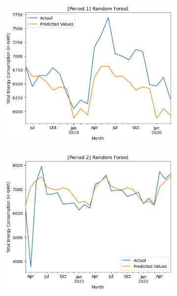 \documentclass[runningheads]{llncs}
\begin{document}
\begin{center}
    \begin{figure}[h]
    \begin{subfigure}[h]{0.6\textwidth}
         \centering
         \hspace*{-1.3in}
         \includegraphics[width=\textwidth]{results/rf/p1.png}
         \caption{}
         \label{fig:resultRF-p1}
    \end{subfigure}
    \begin{subfigure}[h]{0.6\textwidth}
         \centering
         \hspace*{-1.3in}
         \includegraphics[width=\textwidth]{results/rf/p2.png}

\end{subfigure}
\end{figure}
\end{center}
\end{document}
